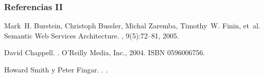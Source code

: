 \begin{frame}
\begin{thebibliography}{10}






  \end{thebibliography}
\end{frame}


\begin{frame}
  \frametitle{Referencias II}
\begin{thebibliography}{10}


Mark~H. Burstein, Christoph Bussler, Michal Zaremba, Timothy~W. Finin, et~al.
 {S}emantic {W}eb {S}ervices {A}rchitecture.
, 9(5):72--81, 2005.

David Chappell.
.
\newblock O'Reilly Media, Inc., 2004.
\newblock ISBN 0596006756.




 Howard Smith y Peter Fingar.
 .
 .


  \end{thebibliography}
\end{frame}

% 
% 
% 
% 
% 
% 
% 
% 
% 
